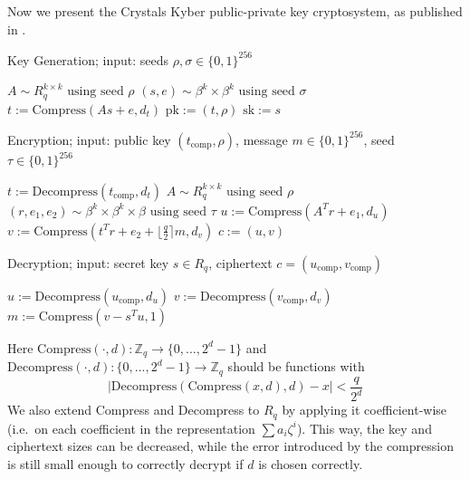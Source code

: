 \documentclass{report}
\newcommand{\Z}{\mathbb{Z}}
\begin{document}
Now we present the Crystals Kyber public-private key cryptosystem, as published in \cite{Kyber}.
\begin{algorithm}[H]
\caption{Key Generation; input: seeds $\rho, \sigma \in \{ 0, 1 \}^{256}$}
\begin{algorithmic}
\STATE $A \sim R_q^{k \times k} \text{ using seed } \rho$
\STATE $(s, e) \sim \beta^k \times \beta^k \text{ using seed } \sigma$
\STATE $t := \mathrm{Compress}(As + e, d_t)$
\RETURN $\mathrm{pk} := (t, \rho)$
\RETURN $\mathrm{sk} := s$
\end{algorithmic}
\end{algorithm}
\begin{algorithm}[H]
\caption{Encryption; input: public key $(t_\mathrm{comp}, \rho)$, message $m \in \{ 0, 1 \}^{256}$, seed $\tau \in \{ 0, 1 \}^{256}$}
\begin{algorithmic}
\STATE $t := \mathrm{Decompress}(t_\mathrm{comp}, d_t)$
\STATE $A \sim R_q^{k \times k} \text{ using seed } \rho$
\STATE $(r, e_1, e_2) \sim \beta^k \times \beta^k \times \beta \text{ using seed } \tau$
\STATE $u := \mathrm{Compress}(A^Tr + e_1, d_u)$
\STATE $v := \mathrm{Compress}(t^Tr + e_2 + \lfloor \frac q 2 \rceil m, d_v)$
\RETURN $c := (u, v)$
\end{algorithmic}
\end{algorithm}
\begin{algorithm}[H]
\caption{Decryption; input: secret key $s \in R_q$, ciphertext $c = (u_\mathrm{comp}, v_\mathrm{comp})$}
\begin{algorithmic}
\STATE $u := \mathrm{Decompress}(u_\mathrm{comp}, d_u)$
\STATE $v := \mathrm{Decompress}(v_\mathrm{comp}, d_v)$
\RETURN $m := \mathrm{Compress}(v - s^Tu, 1)$
\end{algorithmic}
\end{algorithm}
Here $\mathrm{Compress}(\cdot, d): \Z_q \to \{ 0, ..., 2^d - 1 \}$ and $\mathrm{Decompress}(\cdot, d): \{ 0, ..., 2^d - 1 \} \to \Z_q$ should be functions with 
\begin{equation}
\left| \mathrm{Decompress}(\mathrm{Compress}(x, d), d) - x \right| < \frac q {2^d} \nonumber
\end{equation}
We also extend Compress and Decompress to $R_q$ by applying it coefficient-wise (i.e.\ on each coefficient in the representation $\sum a_i \zeta^i$). This way, the key and ciphertext sizes can be decreased, while the error introduced by the compression is still small enough to correctly decrypt if $d$ is chosen correctly.
\end{document}
